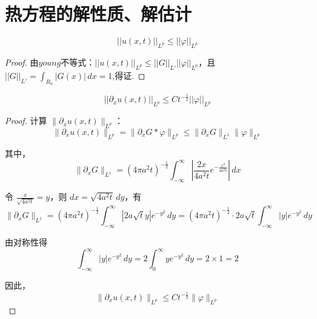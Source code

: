 \section{热方程的解性质、解估计}

\begin{theorem}
$$||u(x,t)||_{L^p}\leq ||\varphi||_{L^p}$$
\end{theorem}

\begin{proof}
    由$young$不等式：$||u(x,t)||_{L^p}\leq ||G||_{L'} ||\varphi||_{L^p}$，且$||G||_{L'} = \int_{R_n}|G(x)|\,dx=1$,得证.
\end{proof}

\begin{theorem}
    $$||\partial_x u(x,t)||_{L^p} \leq Ct^{-\frac{1}{2}}||\varphi||_{L^p}$$
\end{theorem}

\begin{proof}
计算 $\| \partial_x u(x, t) \|_{L^p}$：
$$\| \partial_x u(x, t) \|_{L^p} = \| \partial_x G * \varphi \|_{L^p} \leq \| \partial_x G \|_{L^1} \| \varphi \|_{L^p}$$

其中，
$$\| \partial_x G \|_{L^1} = (4\pi a^2 t)^{-\frac{1}{2}} \int_{-\infty}^{\infty} \left| \frac{2x}{4a^2t}e^{-\frac{x^2}{4a^2t}} \right| \, dx$$

令 $\frac{x}{\sqrt{4a^2 t}} = y$，则 $dx = \sqrt{4a^2 t} \, dy$，有
$$\| \partial_x G \|_{L^1} = (4\pi a^2 t)^{-\frac{1}{2}} \int_{-\infty}^{\infty} \left| 2 a \sqrt{t} y \right| e^{-y^2} \, dy = (4\pi a^2 t)^{-\frac{1}{2}} \cdot 2a \sqrt{t} \int_{-\infty}^{\infty} |y| e^{-y^2} \, dy$$

由对称性得
$$\int_{-\infty}^{\infty} |y| e^{-y^2} \, dy = 2 \int_{0}^{\infty} y e^{-y^2} \, dy = 2 \times 1 = 2$$

因此，
$$\| \partial_x u(x, t) \|_{L^p} \leq C t^{-\frac{1}{2}} \| \varphi \|_{L^p}$$
\end{proof}